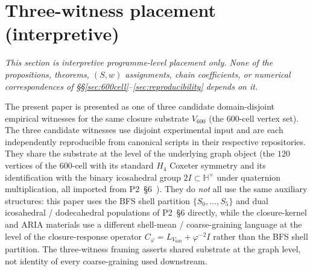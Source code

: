 \documentclass[12pt]{article}
\begin{document}
\section{Three-witness placement (interpretive)}\label{sec:three-witness}

\emph{This section is interpretive programme-level placement only. None of the propositions, theorems, $(S,w)$ assignments, chain coefficients, or numerical correspondences of \S\S\ref{sec:600cell}--\ref{sec:reproducibility} depends on it.}\medskip

The present paper is presented as one of three candidate domain-disjoint empirical witnesses for the same closure substrate $V_{600}$ (the $600$-cell vertex set). The three candidate witnesses use disjoint experimental input and are each independently reproducible from canonical scripts in their respective repositories. They share the substrate at the level of the underlying graph object (the $120$ vertices of the $600$-cell with its standard $H_4$ Coxeter symmetry and its identification with the binary icosahedral group $2I \subset \mathbb{H}^\times$ under quaternion multiplication, all imported from P2~\S 6~\citep{CascadeAlgSubstrate}). They do \emph{not} all use the same auxiliary structures: this paper uses the BFS shell partition $\{S_0, \ldots, S_5\}$ and dual icosahedral / dodecahedral populations of P2~\S 6 directly, while the closure-kernel and ARIA materials use a different shell-mean / coarse-graining language at the level of the closure-response operator $C_\varphi = L_{V_{600}} + \varphi^{-2} I$ rather than the BFS shell partition. The three-witness framing asserts shared substrate at the graph level, not identity of every coarse-graining used downstream.
\end{document}
